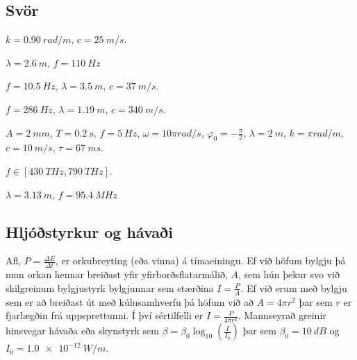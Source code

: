 \subsection*{Svör}

\begin{enumerate*}[label = \vspace{0.15cm} \textbf{(\arabic*)}]
    \setcounter{enumi}{7}
  \item $k = \SI{0.90}{rad/m}$, $c = \SI{25}{m/s}$.
  \item $\lambda = \SI{2.6}{m}$, $f = \SI{110}{Hz}$
  \item $f = \SI{10.5}{Hz}$, $\lambda = \SI{3.5}{m}$, $c = \SI{37}{m/s}$.
  \item $f = \SI{286}{Hz}$, $\lambda = \SI{1.19}{m}$, $c = \SI{340}{m/s}$.
  \item $A = \SI{2}{mm}$, $T = \SI{0.2}{s}$, $f = \SI{5}{Hz}$, $\omega = 10 \pi \si{rad/s}$, $\varphi_0 = -\frac{\pi}{2}$, $\lambda = \SI{2}{m}$, $k = \pi \si{rad/m}$, $c = \SI{10}{m/s}$, $\tau = \SI{67}{ms}$.
  \item $f \in [\SI{430}{THz}, \SI{790}{THz}]$.
  \item $\lambda = \SI{3.13}{m}$, $f = \SI{95.4}{MHz}$
\end{enumerate*}

\newpage

\subsection*{Hljóðstyrkur og hávaði}

\begin{tcolorbox}
Afl, $P = \frac{\Delta E}{\Delta t}$, er orkubreyting (eða vinna) á tímaeiningu. Ef við höfum bylgju þá mun orkan hennar breiðast yfir yfirborðsflatarmálið, $A$, sem hún þekur svo við skilgreinum bylgjustyrk bylgjunnar sem stærðina $I = \frac{P}{A}$. Ef við erum með bylgju sem er að breiðast út með kúlusamhverfu þá höfum við að $A = 4\pi r^2$ þar sem $r$ er fjarlægðin frá uppsprettunni. Í því sértilfelli er $I = \frac{P}{4\pi r^2}$. Mannseyrað greinir hinsvegar hávaða eða skynstyrk sem $\beta = \beta_0 \log_{10}\left( \frac{I}{I_0} \right)$ þar sem $\beta_0 = \SI{10}{dB}$ og $I_0 = \SI{1.0e-12}{W/m}$.
\end{tcolorbox}

